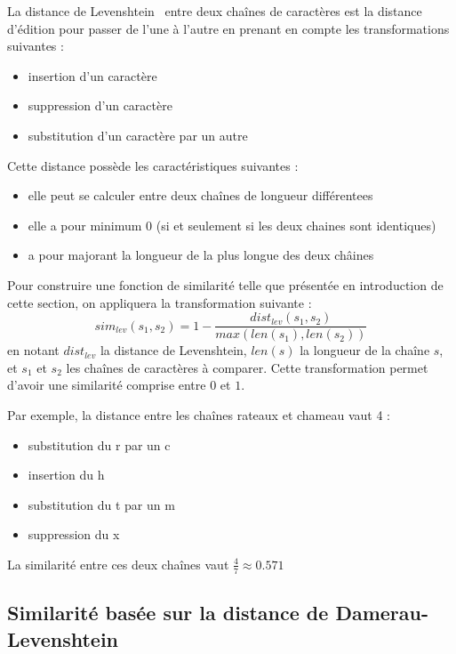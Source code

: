             La distance de Levenshtein~\cite{levenshtein_wiki}  entre deux chaînes de caractères est la distance d'édition pour passer de l'une à l'autre en prenant en compte les transformations suivantes :
            \begin{itemize}
                \item insertion d'un caractère 
                \item suppression d'un caractère
                \item substitution d'un caractère par un autre
            \end{itemize}
            Cette distance possède les caractéristiques suivantes : 
            \begin{itemize}
                \item elle peut se calculer entre deux chaînes de longueur différentees
                \item elle a pour minimum 0 (si et seulement si les deux chaines sont identiques)
                \item a pour majorant la longueur de la plus longue des deux châines
            \end{itemize}
            Pour construire une fonction de similarité telle que présentée en introduction de cette section, on appliquera la transformation suivante : 
            \[sim_{lev}(s_{1}, s_{2}) = 1 - \frac{dist_{lev}(s_{1}, s_{2})}{max(len(s_{1}), len(s_{2}))}\]
            en notant $dist_{lev}$ la distance de Levenshtein, $len(s)$ la longueur de la chaîne $s$, et $s_{1}$ et $s_{2}$ les chaînes de caractères à comparer.
            Cette transformation permet d'avoir une similarité comprise entre $0$ et $1$.

            Par exemple, la distance entre les chaînes \og rateaux \fg et \og chameau \fg vaut 4 :
            \begin{itemize}
                \item substitution du \og r \fg par un \og c \fg
                \item insertion du \og h \fg
                \item substitution du \og t \fg par un \og m \fg
                \item suppression du \og x \fg
            \end{itemize}
            La similarité entre ces deux chaînes vaut $\frac{4}{7} \approx 0.571$

            \subsection{Similarité basée sur la distance de Damerau-Levenshtein}

